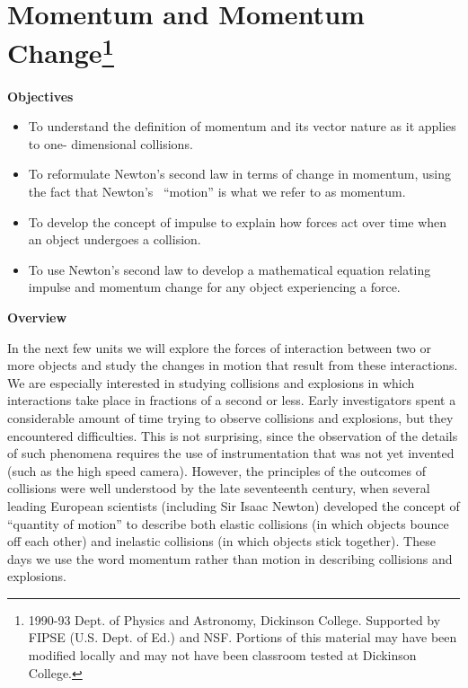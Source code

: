 
\section{Momentum and Momentum Change\footnote{
1990-93 Dept. of Physics and Astronomy, Dickinson College. Supported by FIPSE
(U.S. Dept. of Ed.) and NSF. Portions of this material may have been modified
locally and may not have been classroom tested at Dickinson College.
}}

\makelabheader %

\textbf{Objectives} 

\begin{itemize}
\item To understand the definition of momentum and its vector nature as it applies
to one- dimensional collisions. 
\item To reformulate Newton's second law in terms of change in momentum, using the
fact that Newton's \ ``motion'' is what we refer to as momentum. 
\item To develop the concept of impulse to explain how forces act over time when an
object undergoes a collision. 
\item To use Newton's second law to develop a mathematical equation relating impulse
and momentum change for any object experiencing a force.
\end{itemize}
\textbf{Overview }

In the next few units we will explore the forces of interaction between two
or more objects and study the changes in motion that result from these interactions.
We are especially interested in studying collisions and explosions in which
interactions take place in fractions of a second or less. Early investigators
spent a considerable amount of time trying to observe collisions and explosions,
but they encountered difficulties. This is not surprising, since the observation
of the details of such phenomena requires the use of instrumentation that was
not yet invented (such as the high speed camera). However, the principles of
the outcomes of collisions were well understood by the late seventeenth century,
when several leading European scientists (including Sir Isaac Newton) developed
the concept of ``quantity of motion'' 
to describe both elastic collisions (in which
objects bounce off each other) and inelastic collisions (in which objects stick
together). These days we use the word momentum rather than motion in describing
collisions and explosions.

